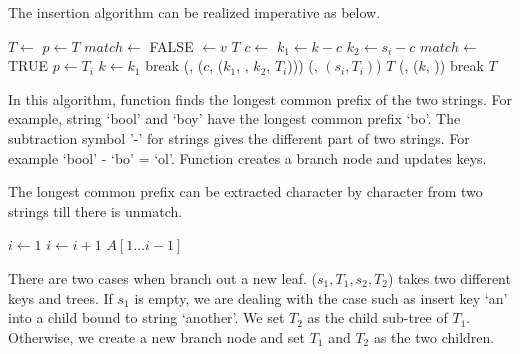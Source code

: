 \documentclass{article}
\begin{document}
The insertion algorithm can be realized imperative as below.

\begin{algorithmic}[1]
   \State $T \gets$ 
  \EndIf
  \State $p \gets T$
  \Loop
    \State $match \gets$ FALSE
        \State {} $\gets v$
        \State \Return $T$
      \EndIf
      \State $c \gets$ 
      \State $k_1 \gets k - c$
      \State $k_2 \gets s_i - c$
        \State $match \gets$ TRUE
         
          \State $p \gets T_i$
          \State $k \gets k_1$
          \State break
        \Else {}
          \State {}(, ($c$, ($k_1$, , $k_2$, $T_i$)))
          \State {}(, $(s_i, T_i)$)
          \State \Return $T$
        \EndIf
      \EndIf
    \EndFor
     
      \State {}(, ($k$, ))
      \State break
    \EndIf
  \EndLoop
  \State \Return $T$
\EndFunction
\end{algorithmic}

In this algorithm, function  finds the longest
common prefix of the two strings. For example, string `bool' and `boy'
have the longest common prefix `bo'. The subtraction symbol '-' for
strings gives the different part of two strings. For example `bool' - `bo' = `ol'. Function  creates a branch node and updates keys.

The longest common prefix can be extracted character by character from two strings till there is unmatch.

\begin{algorithmic}[1]
  \State $i \gets 1 $
    \State $i \gets i + 1$
  \EndWhile
  \State \Return $A[1...i-1]$
\EndFunction
\end{algorithmic}

There are two cases when branch out a new leaf. ($s_1, T_1, s_2, T_2$)
takes two different keys and trees. If $s_1$ is empty, we are
dealing with the case such as insert key `an' into a child bound to
string `another'. We set $T_2$ as the child sub-tree of $T_1$. Otherwise,
we create a new branch node and set $T_1$ and $T_2$ as the two children.
\end{document}
